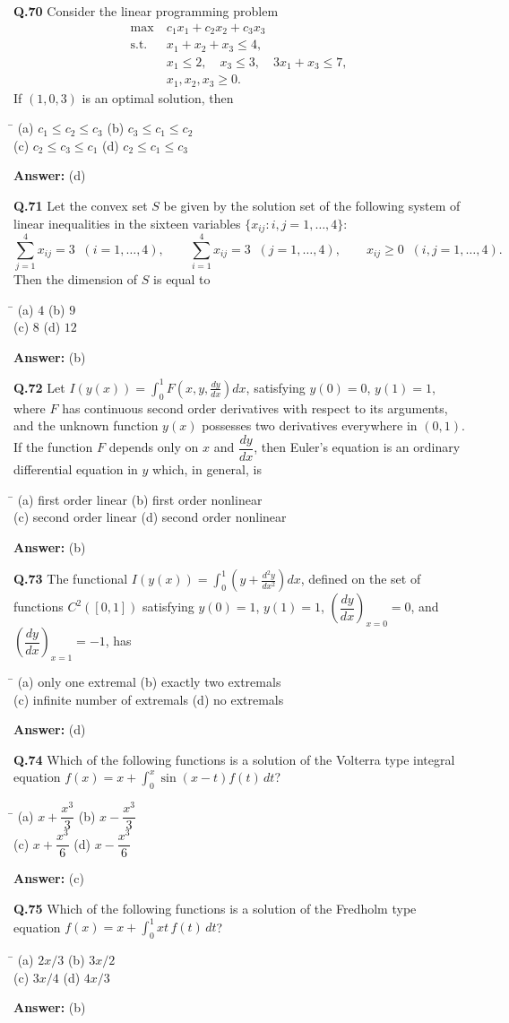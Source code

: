 \documentclass[11pt,a4paper]{article}
\newcommand{\optsfour}[4]{%
  \begin{tabbing}
    \hspace{0.48\linewidth}\=\kill
    (a) #1 \> (b) #2 \\[2pt]
    (c) #3 \> (d) #4
  \end{tabbing}%
}
\newcommand{\ans}[1]{\textbf{Answer:} #1\par\medskip}
\begin{document}
\textbf{Q.70} Consider the linear programming problem
\begin{align*}
  \max\ & c_1 x_1 + c_2 x_2 + c_3 x_3 \\
  \text{s.t. } & x_1 + x_2 + x_3 \le 4, \\
               & x_1 \le 2,\quad x_3 \le 3,\quad 3x_1 + x_3 \le 7, \\
               & x_1, x_2, x_3 \ge 0.
\end{align*}
If $(1, 0, 3)$ is an optimal solution, then
\optsfour{$c_1 \le c_2 \le c_3$}{$c_3 \le c_1 \le c_2$}{$c_2 \le c_3 \le c_1$}{$c_2 \le c_1 \le c_3$}
\ans{(d)}

\textbf{Q.71} Let the convex set $S$ be given by the solution set of the following system of linear inequalities in the sixteen variables $\{x_{ij} : i, j = 1, \dots, 4\}$:
\[
  \sum_{j=1}^{4} x_{ij} = 3 \;\;(i = 1, \dots, 4), \qquad \sum_{i=1}^{4} x_{ij} = 3 \;\;(j = 1, \dots, 4), \qquad x_{ij} \ge 0 \;\;(i, j = 1, \dots, 4).
\]
Then the dimension of $S$ is equal to
\optsfour{$4$}{$9$}{$8$}{$12$}
\ans{(b)}

\textbf{Q.72} Let $I(y(x)) = \displaystyle\int_0^1 F\!\left(x, y, \frac{dy}{dx}\right)dx$, satisfying $y(0) = 0$, $y(1) = 1$, where $F$ has continuous second order derivatives with respect to its arguments, and the unknown function $y(x)$ possesses two derivatives everywhere in $(0, 1)$. If the function $F$ depends only on $x$ and $\dfrac{dy}{dx}$, then Euler's equation is an ordinary differential equation in $y$ which, in general, is
\optsfour{first order linear}{first order nonlinear}{second order linear}{second order nonlinear}
\ans{(b)}

\textbf{Q.73} The functional $I(y(x)) = \displaystyle\int_0^1 \left(y + \frac{d^2 y}{dx^2}\right)dx$, defined on the set of functions $C^2([0, 1])$ satisfying $y(0) = 1$, $y(1) = 1$, $\left(\dfrac{dy}{dx}\right)_{x=0} = 0$, and $\left(\dfrac{dy}{dx}\right)_{x=1} = -1$, has
\optsfour{only one extremal}{exactly two extremals}{infinite number of extremals}{no extremals}
\ans{(d)}

\textbf{Q.74} Which of the following functions is a solution of the Volterra type integral equation $f(x) = x + \displaystyle\int_0^x \sin(x - t)f(t)\,dt$?
\optsfour{$x + \dfrac{x^3}{3}$}{$x - \dfrac{x^3}{3}$}{$x + \dfrac{x^3}{6}$}{$x - \dfrac{x^3}{6}$}
\ans{(c)}

\textbf{Q.75} Which of the following functions is a solution of the Fredholm type equation $f(x) = x + \displaystyle\int_0^1 xt\,f(t)\,dt$?
\optsfour{$2x/3$}{$3x/2$}{$3x/4$}{$4x/3$}
\ans{(b)}
\end{document}
